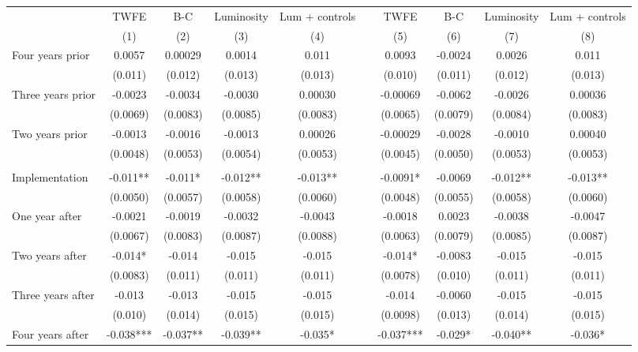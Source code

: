\begin{tabular}{lccccccccc}
\toprule
      & TWFE  & B-C   & Luminosity & Lum + controls &       & TWFE  & B-C   & Luminosity & Lum + controls \\
\cmidrule{2-5}\cmidrule{7-10}      & (1)   & (2)   & (3)   & (4)   &       & (5)   & (6)   & (7)   & (8) \\
\midrule
\midrule
Four years prior & 0.0057 & 0.00029 & 0.0014 & 0.011 &       & 0.0093 & -0.0024 & 0.0026 & 0.011 \\
      & (0.011) & (0.012) & (0.013) & (0.013) &       & (0.010) & (0.011) & (0.012) & (0.013) \\
Three years prior & -0.0023 & -0.0034 & -0.0030 & 0.00030 &       & -0.00069 & -0.0062 & -0.0026 & 0.00036 \\
      & (0.0069) & (0.0083) & (0.0085) & (0.0083) &       & (0.0065) & (0.0079) & (0.0084) & (0.0083) \\
Two years prior & -0.0013 & -0.0016 & -0.0013 & 0.00026 &       & -0.00029 & -0.0028 & -0.0010 & 0.00040 \\
      & (0.0048) & (0.0053) & (0.0054) & (0.0053) &       & (0.0045) & (0.0050) & (0.0053) & (0.0053) \\
      &       &       &       &       &       &       &       &       &  \\
Implementation & -0.011** & -0.011* & -0.012** & -0.013** &       & -0.0091* & -0.0069 & -0.012** & -0.013** \\
      & (0.0050) & (0.0057) & (0.0058) & (0.0060) &       & (0.0048) & (0.0055) & (0.0058) & (0.0060) \\
One year after & -0.0021 & -0.0019 & -0.0032 & -0.0043 &       & -0.0018 & 0.0023 & -0.0038 & -0.0047 \\
      & (0.0067) & (0.0083) & (0.0087) & (0.0088) &       & (0.0063) & (0.0079) & (0.0085) & (0.0087) \\
Two years after & -0.014* & -0.014 & -0.015 & -0.015 &       & -0.014* & -0.0083 & -0.015 & -0.015 \\
      & (0.0083) & (0.011) & (0.011) & (0.011) &       & (0.0078) & (0.010) & (0.011) & (0.011) \\
Three years after & -0.013 & -0.013 & -0.015 & -0.015 &       & -0.014 & -0.0060 & -0.015 & -0.015 \\
      & (0.010) & (0.014) & (0.015) & (0.015) &       & (0.0098) & (0.013) & (0.014) & (0.015) \\
Four years after & -0.038*** & -0.037** & -0.039** & -0.035* &       & -0.037*** & -0.029* & -0.040** & -0.036* \\

\end{tabular}

